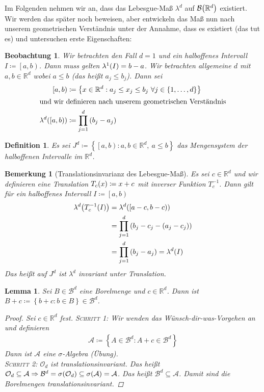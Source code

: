 \documentclass[11pt, twoside, a4paper]{article}
\theoremstyle{plain}
\newtheorem{bemerkung}[blockelement]{Bemerkung}
\newtheorem{definition}[blockelement]{Definition}
\newtheorem{lemma}[blockelement]{Lemma}
\newtheorem{beobachtung}[blockelement]{Beobachtung}
\numberwithin{equation}{subsection}
\newcommand{\set}[1]{\left\{#1\right\}}
\newcommand{\pair}[1]{\left(#1\right)}
\newcommand{\of}[1]{\mathopen{}\mathclose{}\bgroup\left(#1\aftergroup\egroup\right)}
\newcommand{\linterv}[1]{\left[#1\right)}
\newcommand{\impl}[0]{\Rightarrow{}}
\newcommand{\anf}[1]{\glqq{}#1\grqq}
\newcommand{\R}{\mathbb{R}}
\newcommand{\mA}{\mathcal{A}}
\newcommand{\mB}{\mathcal{B}}
\newcommand{\mO}{\mathcal{O}}
\begin{document}
    Im Folgenden nehmen wir an, dass das Lebesgue-Maß $\lambda^d$ auf $\mB\of{\R^d}$ existiert. Wir werden das später noch beweisen, aber entwickeln das Maß nun nach unserem geometrischen Verständnis unter der Annahme, dass es existiert (das tut es) und untersuchen erste Eigenschaften:

    \begin{beobachtung}
        Wir betrachten den Fall $d=1$ und ein halboffenes Intervall $I\coloneqq \linterv{a,b}$. Dann muss gelten $\lambda^1\of{I} = b-a$. Wir betrachten allgemeine $d$ mit $a,b\in\R^d$ wobei $a\leq b$ (das heißt $a_j \leq b_j$). Dann sei
        \begin{align*}
            \linterv{a,b} &\coloneqq \set{x\in\R^d: a_j \leq x_j \leq b_j~\forall j\in\set{1,\ldots, d}}\\
            \intertext{und wir definieren nach unserem geometrischen Verständnis}
            \lambda^d\of{\linterv{a,b}} &\coloneqq \prod_{j=1}^{d} \pair{b_j - a_j}
        \end{align*}
    \end{beobachtung}

    \begin{definition}
        Es sei $J^d \coloneqq \set{\linterv{a,b}: a,b\in\R^d,~a\leq b}$ das Mengensystem der halboffenen Intervalle im $\R^d$.
    \end{definition}

    \begin{bemerkung}[Translationsinvarianz des Lebesgue-Maß]
        Es sei $c\in\R^d$ und wir definieren eine Translation $T_c\of{x} \coloneqq x+c$ mit inverser Funktion $T_c^{-1}$. Dann gilt für ein halboffenes Intervall $I \coloneqq \linterv{a,b}$
        \begin{align*}
            \lambda^d\of{T_c^{-1}\of{I}} &= \lambda^d\of{\linterv{a-c, b-c}}\\
            &= \prod_{j=1}^{d} \pair{b_j - c_j - \pair{a_j - c_j}}\\
            &= \prod_{j=1}^{d} \pair{b_j - a_j} = \lambda^d\of{I}
        \end{align*}
        Das heißt auf $J^d$ ist $\lambda^d$ invariant unter Translation.
    \end{bemerkung}

    \begin{lemma}
        Sei $B \in\mB^d$ eine Borelmenge und $c\in\R^d$. Dann ist $B + c \coloneqq\set{b+c: b\in B} \in\mB^d$.
        \begin{proof}
            Sei $c\in\R^d$ fest. \textsc{Schritt 1}: Wir wenden das \anf{Wünsch-dir-was}-Vorgehen an und definieren
            \begin{align*}
                \mA \coloneqq \set{A \in \mB^d: A + c \in \mB^d}
            \end{align*}
            Dann ist $\mA$ eine $\sigma$-Algebra (Übung).\\
            \textsc{Schritt 2}: $\mO_d$ ist translationsinvariant. Das heißt $\mO_d \subseteq \mA \impl \mB^d = \sigma\of{\mO_d} \subseteq \sigma\of{\mA} = \mA$. Das heißt $\mB^d \subseteq \mA$. Damit sind die Borelmengen translationsinvariant.
        \end{proof}
    \end{lemma}
\end{document}
